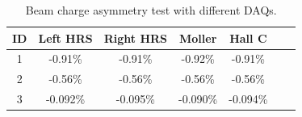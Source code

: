 \begin{table}[h!]
  \centering
  \begin{tabular}{|*{7}{c|}}
    \hline
    ID & Left HRS & Right HRS & Moller & Hall C \\ \hline
    1 & -0.91\% & -0.91\% & -0.92\% & -0.91\% \\ \hline
    2 & -0.56\% & -0.56\% & -0.56\% & -0.56\% \\ \hline
    3 & -0.092\% & -0.095\% & -0.090\% & -0.094\% \\ \hline
  \end{tabular}
  \caption{Beam charge asymmetry test with different DAQs. \label{A2S3T1}}
\end{table}

\clearpage
\newpage

